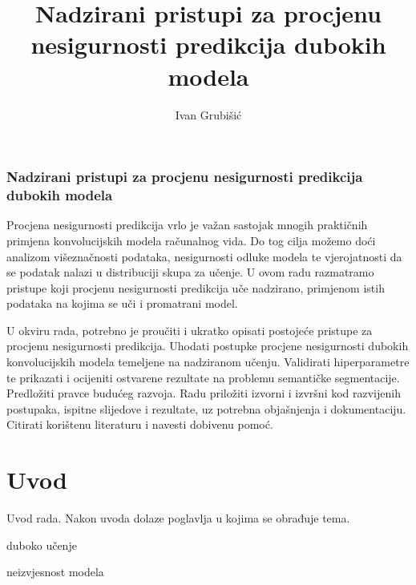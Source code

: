 \documentclass[utf8, diplomski, lmodern]{fer}
\begin{document}
\title{Nadzirani pristupi za procjenu nesigurnosti predikcija dubokih modela}
\author{Ivan Grubišić}
\maketitle

\izvornik
\subsection*{Nadzirani pristupi za procjenu nesigurnosti predikcija dubokih modela}

Procjena nesigurnosti predikcija vrlo je važan sastojak mnogih praktičnih primjena konvolucijskih modela računalnog vida. Do tog cilja možemo doći analizom višeznačnosti podataka, nesigurnosti odluke modela te vjerojatnosti da se podatak nalazi u distribuciji skupa za učenje. U ovom radu razmatramo pristupe koji procjenu nesigurnosti predikcija uče nadzirano, primjenom istih podataka na kojima se uči i promatrani model.

U okviru rada, potrebno je proučiti i ukratko opisati postojeće pristupe za procjenu nesigurnosti predikcija. Uhodati postupke procjene nesigurnosti dubokih konvolucijskih modela temeljene na nadziranom učenju. Validirati hiperparametre te prikazati i ocijeniti ostvarene rezultate na problemu semantičke segmentacije. Predložiti pravce budućeg razvoja.
Radu priložiti izvorni i izvršni kod razvijenih postupaka, ispitne slijedove i rezultate, uz potrebna objašnjenja i dokumentaciju. Citirati korištenu literaturu i navesti dobivenu pomoć.



\tableofcontents

\newpage

\begingroup
\onehalfspacing
\printunsrtglossary[type=symbols,style=supergroup,title={Oznake}]
\endgroup



\chapter{Uvod}
Uvod rada. Nakon uvoda dolaze poglavlja u kojima se obrađuje tema.

duboko učenje

neizvjesnost modela
\end{document}
